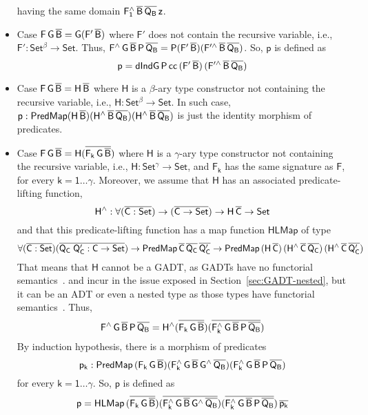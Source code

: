 \documentclass[9pt]{entcs}
\begin{document}
\begin{itemize}
having the same domain $\mathsf{F_1^{\wedge}\,\overline{B}\,\overline{Q_B}\,z}$.
\item Case $\mathsf{F\,G\,\overline{B} = G(F'\,\overline{B})}$
where $\mathsf{F'}$ does not contain the recursive variable,
i.e., $\mathsf{F' : Set^\beta \to Set}$.
Thus, $\mathsf{F^{\wedge}\,G\,\overline{B}\,P\,\overline{Q_B} = P (F'\,\overline{B}) (F'^{\wedge}\,\overline{B}\,\overline{Q_B})}$.
So, $\mathsf{p}$ is defined as
\[
\mathsf{p = dIndG\,P\,cc\,(F'\,\overline{B})\,(F'^{\wedge}\,\overline{B}\,\overline{Q_B})}
\]
\item Case $\mathsf{F\,G\,\overline{B} = H\,\overline{B}}$
where $\mathsf{H}$ is a $\mathsf{\beta}$-ary type constructor not containing the recursive variable,
i.e., $\mathsf{H : Set^\beta \to Set}$.
In such case, $\mathsf{p : PredMap (H\,\overline{B}) (H^{\wedge}\,\overline{B}\,\overline{Q_B}) (H^{\wedge}\,\overline{B}\,\overline{Q_B})}$
is just the identity morphism of predicates.
\item Case $\mathsf{F\,G\,\overline{B} = H (\overline{F_k\,G\,\overline{B}})}$
where $\mathsf{H}$ is a $\mathsf{\gamma}$-ary type constructor not containing the recursive variable,
i.e., $\mathsf{H : Set^\gamma \to Set}$,
and $\mathsf{F_k}$ has the same signature as $\mathsf{F}$, for every $\mathsf{k = 1 \dots \gamma}$.
Moreover, we assume that $\mathsf{H}$ has an associated predicate-lifting function,
\[
\mathsf{H^{\wedge} : \forall (\overline{C : Set}) \to (\overline{C \to Set}) \to H\,\overline{C} \to Set}
\]
and that this predicate-lifting function has a map function $\mathsf{HLMap}$ of type
\[
\mathsf{\forall (\overline{C : Set}) (\overline{Q_C\;Q_C' : C \to Set}) \to PredMap\,\overline{C}\,\overline{Q_C}\,\overline{Q_C'}
\to PredMap\,(H\,\overline{C})\,(H^{\wedge}\,\overline{C}\,\overline{Q_C})\,(H^{\wedge}\,\overline{C}\,\overline{Q_C'})}
\]
That means that $\mathsf{H}$ cannot be a GADT,
as GADTs have no functorial semantics~\cite{jgj21}.
and incur in the issue exposed in Section~\ref{sec:GADT-nested},
but it can be an ADT or even a nested type as those types have functorial semantics~\cite{jp19,jgj21}.
Thus,
\[
\mathsf{F^{\wedge}\,G\,\overline{B}\,P\,\overline{Q_B} = H^{\wedge} (\overline{F_k\,G\,\overline{B}}) (\overline{F_k^{\wedge}\,G\,\overline{B}\,P\,\overline{Q_B}})}
\]
By induction hypothesis, there is a morphism of predicates
\[
\mathsf{p_k : PredMap\,(F_k\,G\,\overline{B}) (F_k^{\wedge}\,G\,\overline{B}\,G^{\wedge}\,\overline{Q_B}) (F_k^{\wedge}\,G\,\overline{B}\,P\,\overline{Q_B})}
\]
for every $\mathsf{k = 1 \dots \gamma}$.
So, $\mathsf{p}$ is defined as
\[
\mathsf{p
= HLMap\,(\overline{F_k\,G\,\overline{B}}) (\overline{F_k^{\wedge}\,G\,\overline{B}\,G^{\wedge}\,\overline{Q_B}}) (\overline{F_k^{\wedge}\,G\,\overline{B}\,P\,\overline{Q_B}})\,\overline{p_k}}
\]
\end{itemize}
\end{document}
